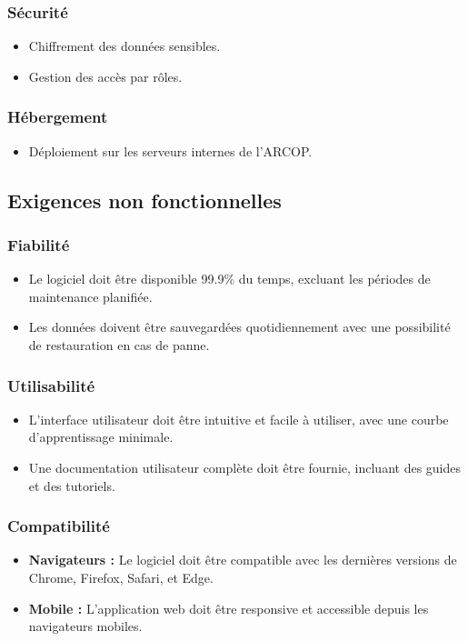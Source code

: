 \subsubsection{Sécurité}
\begin{itemize}
    \item Chiffrement des données sensibles.
    \item Gestion des accès par rôles.
\end{itemize}

\subsubsection{Hébergement}
\begin{itemize}
    \item Déploiement sur les serveurs internes de l'\ac{ARCOP}.
\end{itemize}
\subsection{Exigences non fonctionnelles}


\subsubsection{Fiabilité}
\begin{itemize}
    \item Le logiciel doit être disponible 99.9\% du temps, excluant les périodes de maintenance planifiée.
    \item Les données doivent être sauvegardées quotidiennement avec une possibilité de restauration en cas de panne.
\end{itemize}

\subsubsection{Utilisabilité}
\begin{itemize}
    \item L'interface utilisateur doit être intuitive et facile à utiliser, avec une courbe d'apprentissage minimale.
    \item Une documentation utilisateur complète doit être fournie, incluant des guides et des tutoriels.
\end{itemize}

\subsubsection{Compatibilité}
\begin{itemize}
    \item \textbf{Navigateurs :} Le logiciel doit être compatible avec les dernières versions de Chrome, Firefox, Safari, et Edge.
    \item \textbf{Mobile :} L'application web doit être responsive et accessible depuis les navigateurs mobiles.
\end{itemize}

